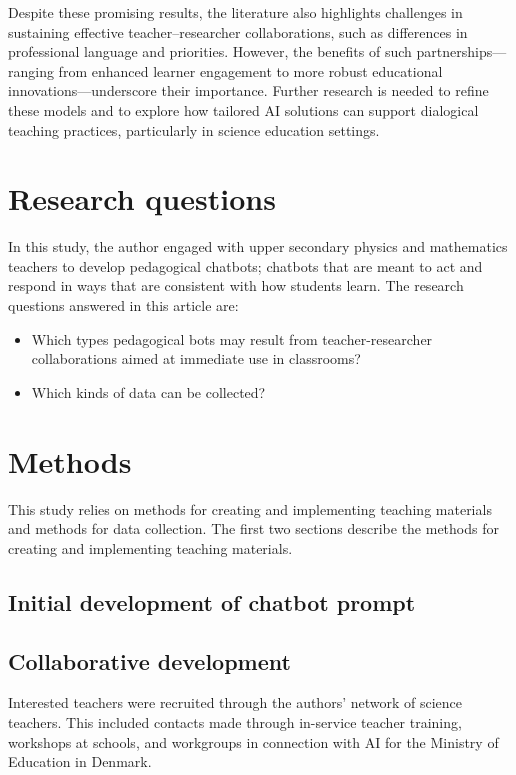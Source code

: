 \documentclass[pdflatex,sn-apa]{sn-jnl}%
\theoremstyle{thmstyleone}%
\theoremstyle{thmstyletwo}%
\theoremstyle{thmstylethree}%
\begin{document}
Despite these promising results, the literature also highlights challenges in sustaining effective teacher–researcher collaborations, such as differences in professional language and priorities. However, the benefits of such partnerships—ranging from enhanced learner engagement to more robust educational innovations—underscore their importance. Further research is needed to refine these models and to explore how tailored AI solutions can support dialogical teaching practices, particularly in science education settings.

\section{Research questions}
In this study, the author engaged with upper secondary physics and mathematics teachers to develop pedagogical chatbots; chatbots that are meant to act and respond in ways that are consistent with how students learn. The research questions answered in this article are:
\begin{itemize}
    \item Which types pedagogical bots may result from teacher-researcher collaborations aimed at immediate use in classrooms?
    \item Which kinds of data can be collected?
    
    
\end{itemize}
\section{Methods}\label{methods}
This study relies on methods for creating and implementing teaching materials and methods for data collection. The first two sections describe the methods for creating and implementing teaching materials. 

\subsection{Initial development of chatbot prompt}


\subsection{Collaborative development}
Interested teachers were recruited through the authors' network of science teachers. This included contacts made through in-service teacher training, workshops at schools, and workgroups in connection with AI for the Ministry of Education in Denmark. 
\end{document}
